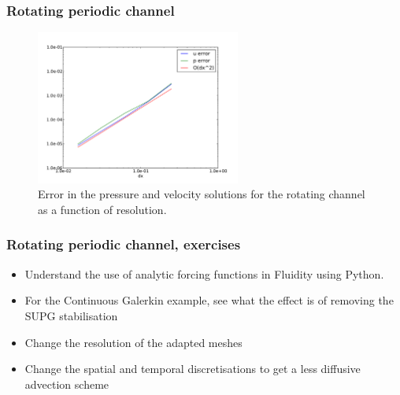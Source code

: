 %
\begin{frame}
    \frametitle{Rotating periodic channel}
\begin{figure}
\includegraphics[width=0.6\textwidth]{./rotating_channel/convergence}
\caption{Error in the pressure and velocity solutions for the rotating channel as a function of resolution.}
\end{figure}
\end{frame}
%
\begin{frame}
    \frametitle{Rotating periodic channel, exercises}
\begin{itemize}
\item Understand the use of analytic forcing functions in Fluidity using Python.
\item For the Continuous Galerkin example, see what the effect is of removing the SUPG stabilisation
\item Change the resolution of the adapted meshes
\item Change the spatial and temporal discretisations to get a less diffusive advection scheme
\end{itemize}
\end{frame}

